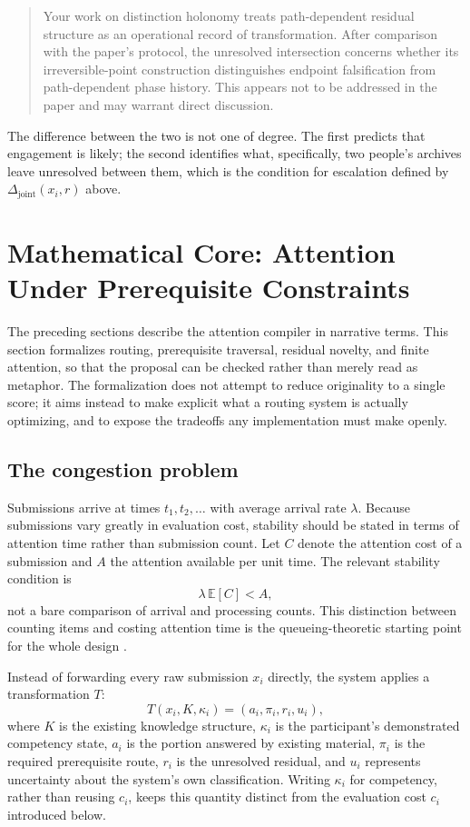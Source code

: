 \documentclass[11pt]{article}
\begin{document}
\begin{quote}
Your work on distinction holonomy treats path-dependent residual structure as an operational record of transformation. After comparison with the paper's protocol, the unresolved intersection concerns whether its irreversible-point construction distinguishes endpoint falsification from path-dependent phase history. This appears not to be addressed in the paper and may warrant direct discussion.
\end{quote}

The difference between the two is not one of degree. The first predicts that engagement is likely; the second identifies what, specifically, two people's archives leave unresolved between them, which is the condition for escalation defined by $\Delta_{\mathrm{joint}}(x_i,r)$ above.

\section{Mathematical Core: Attention Under Prerequisite Constraints}

The preceding sections describe the attention compiler in narrative terms. This section formalizes routing, prerequisite traversal, residual novelty, and finite attention, so that the proposal can be checked rather than merely read as metaphor. The formalization does not attempt to reduce originality to a single score; it aims instead to make explicit what a routing system is actually optimizing, and to expose the tradeoffs any implementation must make openly.

\subsection{The congestion problem}

Submissions arrive at times $t_1, t_2, \dots$ with average arrival rate $\lambda$. Because submissions vary greatly in evaluation cost, stability should be stated in terms of attention time rather than submission count. Let $C$ denote the attention cost of a submission and $A$ the attention available per unit time. The relevant stability condition is
\[
\lambda\,\mathbb{E}[C] < A,
\]
not a bare comparison of arrival and processing counts. This distinction between counting items and costing attention time is the queueing-theoretic starting point for the whole design \cite{kleinrock1975}.

Instead of forwarding every raw submission $x_i$ directly, the system applies a transformation $T$:
\[
T(x_i, K, \kappa_i) = (a_i, \pi_i, r_i, u_i),
\]
where $K$ is the existing knowledge structure, $\kappa_i$ is the participant's demonstrated competency state, $a_i$ is the portion answered by existing material, $\pi_i$ is the required prerequisite route, $r_i$ is the unresolved residual, and $u_i$ represents uncertainty about the system's own classification. Writing $\kappa_i$ for competency, rather than reusing $c_i$, keeps this quantity distinct from the evaluation cost $c_i$ introduced below.
\end{document}
